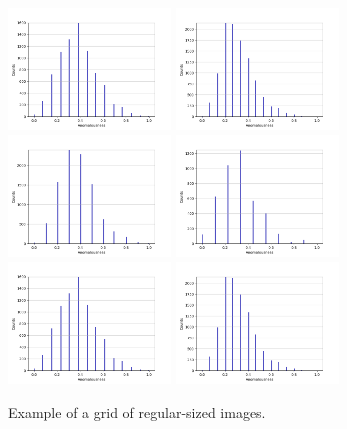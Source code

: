 \begin{figure}[!t]
\includegraphics[width=1.7in]{static/interlocking_tori_hierarchical.png}
\includegraphics[width=1.7in]{static/skewer_hierarchical.png}
\includegraphics[width=1.7in]{static/bullseye_hierarchical.png}
\includegraphics[width=1.7in]{static/spiral_hierarchical.png}
\includegraphics[width=1.7in]{static/interlocking_tori_hierarchical.png}
\includegraphics[width=1.7in]{static/skewer_hierarchical.png}

\caption{
Example of a grid of regular-sized images.
}

\label{results:histograms:example}
\end{figure}


